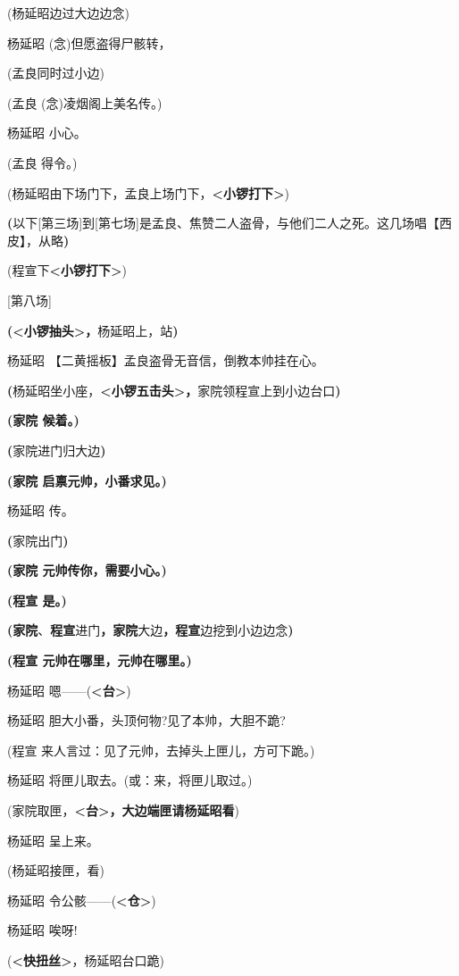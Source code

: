 (杨延昭边过大边边念)

杨延昭 (念)但愿盗得尸骸转，

(孟良同时过小边)

(孟良 (念)凌烟阁上美名传。)

杨延昭 小心。

(孟良 得令。)

(杨延昭由下场门下，孟良上场门下，\textbf{\textless{}小锣打下\textgreater{}})

\textbf{(}以下{[}第三场{]}到{[}第七场{]}是孟良、焦赞二人盗骨，与他们二人之死。这几场唱【西皮】，从略\textbf{)}

(程宣下\textbf{\textless{}小锣打下\textgreater{}})

{[}第八场{]}

\textbf{(\textless{}小锣抽头\textgreater{}，}杨延昭上，站\textbf{)}

杨延昭 【二黄摇板】孟良盗骨无音信，倒教本帅挂在心。

\textbf{(}杨延昭坐小座，\textbf{\textless{}小锣五击头\textgreater{}，}家院领程宣上到小边台口\textbf{)}

\textbf{(家院 候着。)}

\textbf{(}家院进门归大边\textbf{)}

\textbf{(家院 启禀元帅，小番求见。)}

杨延昭 传。

\textbf{(}家院出门\textbf{)}

\textbf{(家院 元帅传你，需要小心。)}

\textbf{(程宣 是。)}

\textbf{(家院}、\textbf{程宣}进门\textbf{，家院}大边\textbf{，程宣}边挖到小边边念\textbf{)}

\textbf{(程宣 元帅在哪里，元帅在哪里。)}

杨延昭 嗯------(\textbf{\textless{}台\textgreater{}})

杨延昭 胆大小番，头顶何物?见了本帅，大胆不跪?

(程宣 来人言过：见了元帅，去掉头上匣儿，方可下跪。)

杨延昭 将匣儿取去。(或：来，将匣儿取过。)

(家院取匣，\textbf{\textless{}台\textgreater{}，大边端匣请杨延昭看})

杨延昭 呈上来。

(杨延昭接匣，看)

杨延昭 令公骸------(\textbf{\textless{}仓\textgreater{}})

杨延昭 唉呀!

(\textbf{\textless{}快扭丝\textgreater{}}，杨延昭台口跪)

